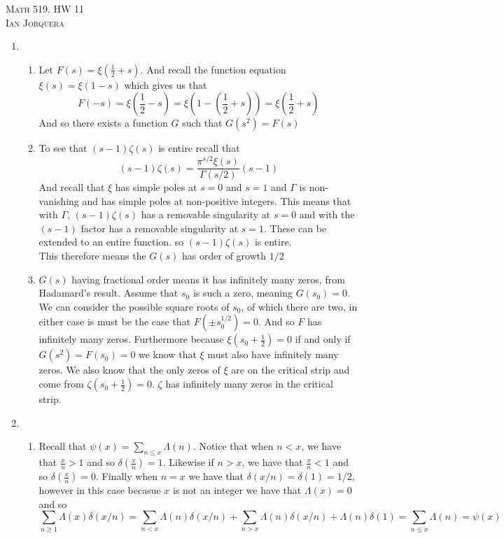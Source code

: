 \documentclass[12pt]{amsart}
\begin{document}
\begin{center}
    \textsc{Math 519. HW 11\\ Ian Jorquera}
\end{center}
\vspace{1em}


\begin{enumerate}
\item 
\begin{enumerate}
\item Let $F(s)=\xi(\frac{1}{2}+s)$. And recall the function equation $\xi(s)=\xi(1-s)$ which gives us that 
$$F(-s)=\xi(\frac{1}{2}-s)=\xi(1-(\frac{1}{2}+s))=\xi(\frac{1}{2}+s)$$
And so there exists a function $G$ such that $G(s^2)=F(s)$
\item To see that $(s-1)\zeta(s)$ is entire recall that 
$$(s-1)\zeta(s)=\frac{\pi^{s/2}\xi(s)}{\Gamma(s/2)}(s-1)$$
And recall that $\xi$ has simple poles at $s=0$ and $s=1$ and $\Gamma$ is non-vanishing and has simple poles at non-positive integers. This means that with $\Gamma$, $(s-1)\zeta(s)$ has a removable singularity at $s=0$ and with the $(s-1)$ factor has a removable singularity at $s=1$. These can be extended to an entire function. so $(s-1)\zeta(s)$ is entire.\\

This therefore means the $G(s)$ has order of growth $1/2$

\item $G(s)$ having fractional order means it has infinitely many zeros, from Hadamard's result. 
Assume that $s_0$ is such a zero, meaning $G(s_0)=0$. We can consider the possible square roots of $s_0$, of which there are two, in either case is must be the case that $F(\pm s_0^{1/2})=0$. And so $F$ has infinitely many zeros. Furthermore because $\xi(s_0+\frac{1}{2})=0$ if and only if $G(s^2)=F(s_0)=0$ we know that $\xi$ must also have infinitely many zeros. We also know that the only zeros of $\xi$ are on the critical strip and come from $\zeta(s_0+\frac{1}{2})=0$. $\zeta$ has infinitely many zeros in the critical strip.\\
\end{enumerate}

\item 
\begin{enumerate}
    \item Recall that $\psi(x)=\sum\limits_{n\leq x}\Lambda(n)$. Notice that when $n< x$, we have that $\frac{x}{n}> 1$ and so $\delta(\frac{x}{n})=1$. Likewise if $n> x$, we have that $\frac{x}{n}< 1$ and so $\delta(\frac{x}{n})=0$. Finally when $n=x$ we have that $\delta(x/n)=\delta(1)=1/2$, however in this case becasue $x$ is not an integer we have that $\Lambda(x)=0$ and so
    $$\sum\limits_{n\geq 1}\Lambda(x)\delta(x/n)=\sum\limits_{n< x}\Lambda(n)\delta(x/n)+\sum\limits_{n>x}\Lambda(n)\delta(x/n)+\Lambda(n)\delta(1)=\sum\limits_{n\leq x}\Lambda(n)=\psi(x)$$


\end{enumerate}
\end{enumerate}
\end{document}
